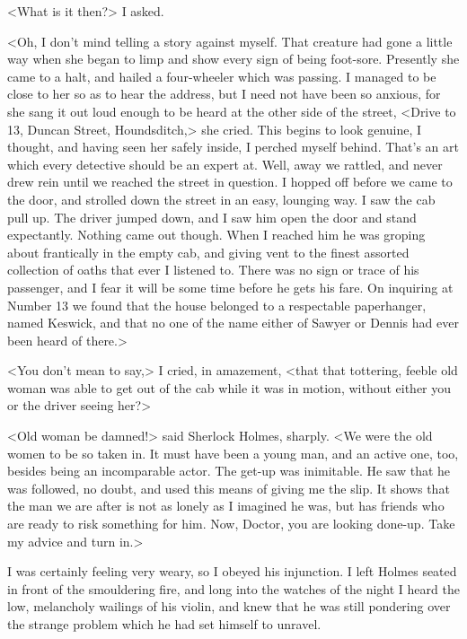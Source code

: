 <What is it then?> I asked.

<Oh, I don't mind telling a story against myself. That creature had gone a little way when she began to limp and show every sign of being foot-sore. Presently she came to a halt, and hailed a four-wheeler which was passing. I managed to be close to her so as to hear the address, but I need not have been so anxious, for she sang it out loud enough to be heard at the other side of the street, <Drive to 13, Duncan Street, Houndsditch,> she cried. This begins to look genuine, I thought, and having seen her safely inside, I perched myself behind. That's an art which every detective should be an expert at. Well, away we rattled, and never drew rein until we reached the street in question. I hopped off before we came to the door, and strolled down the street in an easy, lounging way. I saw the cab pull up. The driver jumped down, and I saw him open the door and stand expectantly. Nothing came out though. When I reached him he was groping about frantically in the empty cab, and giving vent to the finest assorted collection of oaths that ever I listened to. There was no sign or trace of his passenger, and I fear it will be some time before he gets his fare. On inquiring at Number 13 we found that the house belonged to a respectable paperhanger, named Keswick, and that no one of the name either of Sawyer or Dennis had ever been heard of there.>

<You don't mean to say,> I cried, in amazement, <that that tottering, feeble old woman was able to get out of the cab while it was in motion, without either you or the driver seeing her?>

<Old woman be damned!> said Sherlock Holmes, sharply. <We were the old women to be so taken in. It must have been a young man, and an active one, too, besides being an incomparable actor. The get-up was inimitable. He saw that he was followed, no doubt, and used this means of giving me the slip. It shows that the man we are after is not as lonely as I imagined he was, but has friends who are ready to risk something for him. Now, Doctor, you are looking done-up. Take my advice and turn in.>

I was certainly feeling very weary, so I obeyed his injunction. I left Holmes seated in front of the smouldering fire, and long into the watches of the night I heard the low, melancholy wailings of his violin, and knew that he was still pondering over the strange problem which he had set himself to unravel.